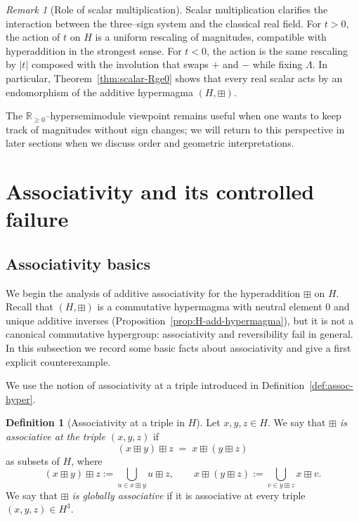 \documentclass[11pt]{amsart}
\numberwithin{equation}{section}
\theoremstyle{definition}
\newtheorem{definition}[theorem]{Definition}
\theoremstyle{remark}
\newtheorem{remark}[theorem]{Remark}
\newcommand{\R}{\mathbb{R}}
\newcommand{\Hnum}{H}                      %
\newcommand{\op}{\boxplus}                 %
\begin{document}
\begin{remark}[Role of scalar multiplication]\label{rem:scalar-summary}
Scalar multiplication clarifies the interaction between the three--sign
system and the classical real field.  For $t>0$, the action of $t$ on
$\Hnum$ is a uniform rescaling of magnitudes, compatible with
hyperaddition in the strongest sense.  For $t<0$, the action is the
same rescaling by $|t|$ composed with the involution that swaps $+$ and
$-$ while fixing $\Lambda$.  In particular, Theorem~\ref{thm:scalar-Rge0}
shows that every real scalar acts by an endomorphism of the additive
hypermagma $(\Hnum,\op)$.

The $\R_{\ge0}$--hypersemimodule viewpoint remains useful when one
wants to keep track of magnitudes without sign changes; we will return
to this perspective in later sections when we discuss order and
geometric interpretations.
\end{remark}


\section{Associativity and its controlled failure}
\label{sec:assoc}


\subsection{Associativity basics}
\label{subsec:assoc-basics}

We begin the analysis of additive associativity for the hyperaddition
$\op$ on $\Hnum$.  Recall that $(\Hnum,\op)$ is a commutative
hypermagma with neutral element $0$ and unique additive inverses
(Proposition~\ref{prop:H-add-hypermagma}), but it is not a canonical
commutative hypergroup: associativity and reversibility fail in
general.  In this subsection we record some basic facts about
associativity and give a first explicit counterexample.

\medskip

We use the notion of associativity at a triple introduced in
Definition~\ref{def:assoc-hyper}.

\begin{definition}[Associativity at a triple in $\Hnum$]
\label{def:assoc-H-triple}
Let $x,y,z\in\Hnum$.  We say that \emph{$\op$ is associative at the
triple $(x,y,z)$} if
\[
  (x\op y)\op z
  \;=\; x\op(y\op z)
\]
as subsets of $\Hnum$, where
\[
  (x\op y)\op z
  := \bigcup_{u\in x\op y} u\op z,
  \qquad
  x\op(y\op z)
  := \bigcup_{v\in y\op z} x\op v.
\]
We say that \emph{$\op$ is globally associative} if it is associative
at every triple $(x,y,z)\in\Hnum^3$.
\end{definition}
\end{document}
